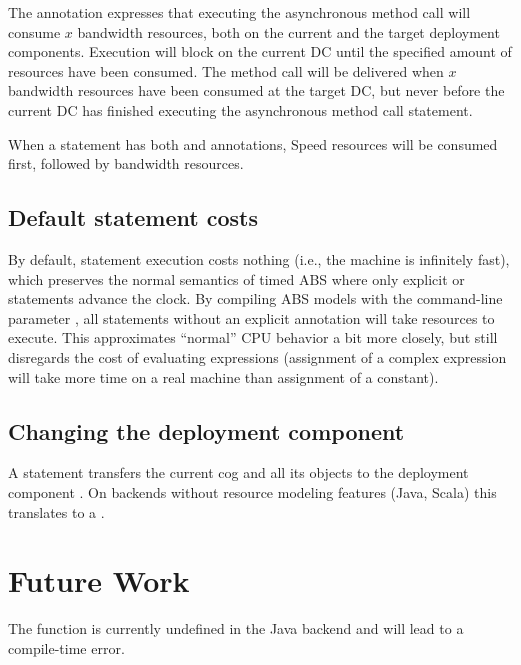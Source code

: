 The annotation  expresses that executing the
asynchronous method call  will consume $x$ bandwidth
resources, both on the current and the target deployment components.
Execution will block on the current DC until the specified amount of resources
have been consumed.  The method call will be delivered when $x$ bandwidth
resources have been consumed at the target DC, but never before the current DC
has finished executing the asynchronous method call statement.

When a statement has both  and  annotations,
Speed resources will be consumed first, followed by bandwidth resources.

\subsection{Default statement costs}

By default, statement execution costs nothing (i.e., the machine is infinitely
fast), which preserves the normal semantics of timed ABS where only explicit
 or  statements advance the
clock.  By compiling ABS models with the command-line parameter
, all statements without an explicit
\absinline{[Cost: x]} annotation will take  resources to execute.
This approximates ``normal'' CPU behavior a bit more closely, but still
disregards the cost of evaluating expressions (assignment of a complex
expression will take more time on a real machine than assignment of a
constant).

\subsection{Changing the deployment component}

A statement  transfers the current cog and all its
objects to the deployment component .  On backends without
resource modeling features (Java, Scala) this translates to a
.

\section{Future Work}

The  function is currently undefined in the Java
backend and will lead to a compile-time error.

